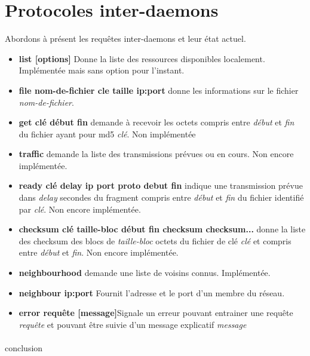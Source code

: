 	\section{Protocoles inter-daemons}
Abordons à présent les requêtes inter-daemons et leur état actuel.

\begin{itemize}
\item{\textbf{list [options]}} Donne la liste des ressources disponibles localement. Implémentée mais sans option pour l'instant.
\item{\textbf{file nom-de-fichier cle taille ip:port}} donne les informations sur le fichier \textit{nom-de-fichier}.
\item{\textbf{get clé début fin}} demande à recevoir les octets compris entre \textit{début} et \textit{fin} du fichier ayant pour md5 \textit{clé}. Non implémentée
\item{\textbf{traffic}} demande la liste des transmissions prévues ou en cours. Non encore implémentée.
\item{\textbf{ready clé delay ip port proto debut fin}} indique une transmission prévue dans \textit{delay} secondes du fragment compris entre \textit{début} et \textit{fin} du fichier identifié par \textit{clé}. Non encore implémentée.
\item{\textbf{checksum clé taille-bloc début fin checksum checksum...}} donne la liste des checksum des blocs de \textit{taille-bloc} octets du fichier de clé \textit{clé} et compris entre \textit{début} et \textit{fin}. Non encore implémentée.
\item{\textbf{neighbourhood}} demande une liste de voisins connus. Implémentée.
\item{\textbf{neighbour ip:port}} Fournit l'adresse et le port d'un membre du réseau.
\item{\textbf{error requête [message]}}Signale un erreur pouvant entrainer une requête \textit{requête} et pouvant être suivie d'un message explicatif \textit{message}
\end{itemize}

	\paragraph*{}conclusion
